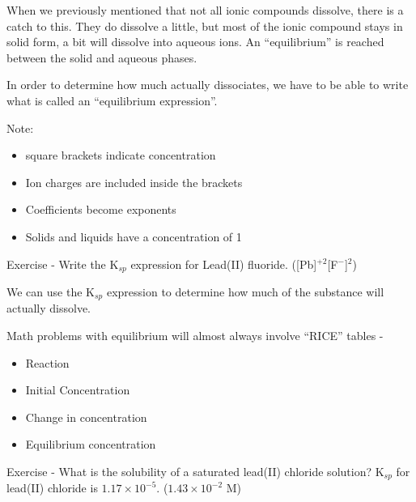 \documentclass[../hchem.tex]{subfiles}
\begin{document}
When we previously mentioned that not all ionic compounds dissolve, there is a catch to this.
They do dissolve a little, but most of the ionic compound stays in solid form, a bit will dissolve into aqueous ions.
An ``equilibrium'' is reached between the solid and aqueous phases.

In order to determine how much actually dissociates, we have to be able to write what is called an ``equilibrium expression''.

Note:
\begin{itemize}
    \item square brackets indicate concentration 
    \item Ion charges are included inside the brackets 
    \item Coefficients become exponents 
    \item Solids and liquids have a concentration of 1
\end{itemize}

Exercise - Write the K$_{sp}$ expression for Lead(II) fluoride. ([Pb]$^{+2}$[F$^-$]$^2$)

We can use the K$_{sp}$ expression to determine how much of the substance will actually dissolve.

Math problems with equilibrium will almost always involve ``RICE'' tables - 
\begin{itemize}
    \item Reaction 
    \item Initial Concentration
    \item Change in concentration
    \item Equilibrium concentration
\end{itemize}

Exercise - What is the solubility of a saturated lead(II) chloride solution? K$_{sp}$ for lead(II) chloride is $1.17\times 10^{-5}$. ($1.43\times 10^{-2}$ M)
\end{document}

